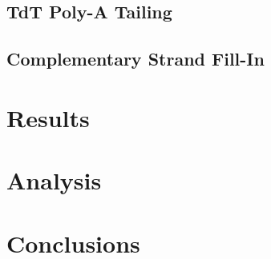 \documentclass{ssiBio}
\begin{document}
\subsection{TdT Poly-A Tailing}

\subsection{Complementary Strand Fill-In}

\section{Results}

\section{Analysis}

\section{Conclusions}



\end{document}
